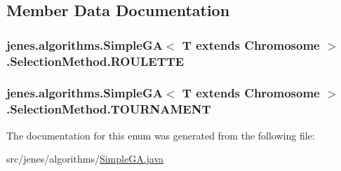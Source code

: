 \subsection{Member Data Documentation}
\hypertarget{enumjenes_1_1algorithms_1_1_simple_g_a_3_01_t_01extends_01_chromosome_01_4_1_1_selection_method_aaa9788ea9a69bb07b709bb79c185e850}{
\subsubsection[{R\-O\-U\-L\-E\-T\-T\-E}]{\setlength{\rightskip}{0pt plus 5cm}jenes.\-algorithms.\-Simple\-G\-A$<$ T extends Chromosome $>$.Selection\-Method.\-R\-O\-U\-L\-E\-T\-T\-E}}\label{enumjenes_1_1algorithms_1_1_simple_g_a_3_01_t_01extends_01_chromosome_01_4_1_1_selection_method_aaa9788ea9a69bb07b709bb79c185e850}
\hypertarget{enumjenes_1_1algorithms_1_1_simple_g_a_3_01_t_01extends_01_chromosome_01_4_1_1_selection_method_aa82c1a99611b7bd81e72f0f8429606cd}{
\subsubsection[{T\-O\-U\-R\-N\-A\-M\-E\-N\-T}]{\setlength{\rightskip}{0pt plus 5cm}jenes.\-algorithms.\-Simple\-G\-A$<$ T extends Chromosome $>$.Selection\-Method.\-T\-O\-U\-R\-N\-A\-M\-E\-N\-T}}\label{enumjenes_1_1algorithms_1_1_simple_g_a_3_01_t_01extends_01_chromosome_01_4_1_1_selection_method_aa82c1a99611b7bd81e72f0f8429606cd}


The documentation for this enum was generated from the following file\-:\begin{DoxyCompactItemize}
\item 
src/jenes/algorithms/\hyperlink{_simple_g_a_8java}{Simple\-G\-A.\-java}\end{DoxyCompactItemize}
